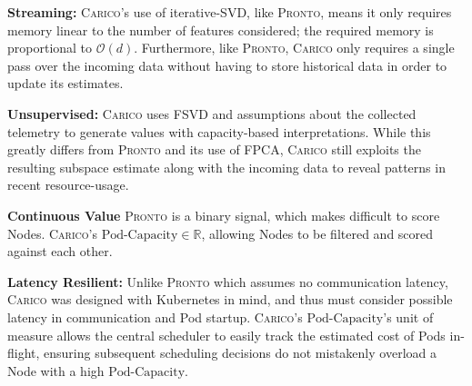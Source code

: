 \textbf{Streaming:} \textsc{Carico}'s use of iterative-SVD, like \textsc{Pronto}, means it only
requires memory linear to the number of features considered; the required memory
is proportional to $\mathcal{O}(d)$. Furthermore, like \textsc{Pronto}, \textsc{Carico} only
requires a single pass over the incoming data without having to store historical
data in order to update its estimates.

\textbf{Unsupervised:} \textsc{Carico} uses FSVD and assumptions about the
collected telemetry to generate values with capacity-based interpretations.
While this greatly differs from \textsc{Pronto} and its use of FPCA,
\textsc{Carico} still exploits the resulting subspace estimate along with the
incoming data to reveal patterns in recent resource-usage.

\textbf{Continuous Value} \textsc{Pronto} is a binary signal, which makes difficult to
score Nodes. \textsc{Carico}'s $\text{Pod-Capacity} \in \mathbb{R}$, allowing
Nodes to be filtered and scored against each other.

\textbf{Latency Resilient:} Unlike \textsc{Pronto} which assumes no communication
latency, \textsc{Carico} was designed with Kubernetes in mind, and thus must consider
possible latency in communication and Pod startup. \textsc{Carico}'s
$\text{Pod-Capacity}$'s unit of measure allows the central scheduler to easily
track the estimated cost of Pods in-flight, ensuring subsequent scheduling
decisions do not mistakenly overload a Node with a high $\text{Pod-Capacity}$.
%
%
%
%

